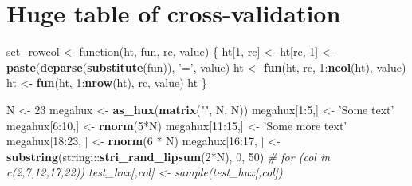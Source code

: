 \documentclass[]{article}
\newenvironment{Shaded}{\begin{snugshade}}{\end{snugshade}}
\newcommand{\KeywordTok}[1]{\textcolor[rgb]{0.13,0.29,0.53}{\textbf{{#1}}}}
\newcommand{\DecValTok}[1]{\textcolor[rgb]{0.00,0.00,0.81}{{#1}}}
\newcommand{\StringTok}[1]{\textcolor[rgb]{0.31,0.60,0.02}{{#1}}}
\newcommand{\CommentTok}[1]{\textcolor[rgb]{0.56,0.35,0.01}{\textit{{#1}}}}
\newcommand{\NormalTok}[1]{{#1}}
\begin{document}
\FloatBarrier

\section{Huge table of
cross-validation}\label{huge-table-of-cross-validation}

\begin{Shaded}
\begin{Highlighting}[]
\NormalTok{set_rowcol <-}\StringTok{ }\NormalTok{function(ht, fun, rc, value) \{}
  \NormalTok{ht[}\DecValTok{1}\NormalTok{, rc] <-}\StringTok{ }\NormalTok{ht[rc, }\DecValTok{1}\NormalTok{] <-}\StringTok{ }\KeywordTok{paste}\NormalTok{(}\KeywordTok{deparse}\NormalTok{(}\KeywordTok{substitute}\NormalTok{(fun)), }\StringTok{'='}\NormalTok{, value)}
  \NormalTok{ht <-}\StringTok{ }\KeywordTok{fun}\NormalTok{(ht, rc, }\DecValTok{1}\NormalTok{:}\KeywordTok{ncol}\NormalTok{(ht), value)}
  \NormalTok{ht <-}\StringTok{ }\KeywordTok{fun}\NormalTok{(ht, }\DecValTok{1}\NormalTok{:}\KeywordTok{nrow}\NormalTok{(ht), rc, value)}
  \NormalTok{ht}
\NormalTok{\}}

\NormalTok{N <-}\StringTok{ }\DecValTok{23}
\NormalTok{megahux <-}\StringTok{ }\KeywordTok{as_hux}\NormalTok{(}\KeywordTok{matrix}\NormalTok{(}\StringTok{""}\NormalTok{, N, N))}
\NormalTok{megahux[}\DecValTok{1}\NormalTok{:}\DecValTok{5}\NormalTok{,] <-}\StringTok{ 'Some text'}
\NormalTok{megahux[}\DecValTok{6}\NormalTok{:}\DecValTok{10}\NormalTok{,] <-}\StringTok{ }\KeywordTok{rnorm}\NormalTok{(}\DecValTok{5}\NormalTok{*N)}
\NormalTok{megahux[}\DecValTok{11}\NormalTok{:}\DecValTok{15}\NormalTok{,] <-}\StringTok{ 'Some more text'}
\NormalTok{megahux[}\DecValTok{18}\NormalTok{:}\DecValTok{23}\NormalTok{, ] <-}\StringTok{ }\KeywordTok{rnorm}\NormalTok{(}\DecValTok{6} \NormalTok{*}\StringTok{ }\NormalTok{N)}
\NormalTok{megahux[}\DecValTok{16}\NormalTok{:}\DecValTok{17}\NormalTok{, ] <-}\StringTok{ }\KeywordTok{substring}\NormalTok{(stringi::}\KeywordTok{stri_rand_lipsum}\NormalTok{(}\DecValTok{2}\NormalTok{*N), }\DecValTok{0}\NormalTok{, }\DecValTok{50}\NormalTok{)}
\CommentTok{# for (col in c(2,7,12,17,22)) test_hux[,col] <- sample(test_hux[,col])}



\end{Highlighting}
\end{Shaded}
\end{document}
